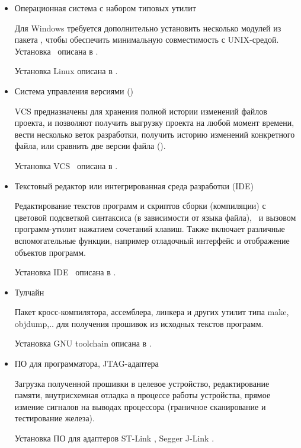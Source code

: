 
\begin{itemize}
  \item Операционная система с набором типовых утилит
  
  Для Windows требуется дополнительно установить несколько модулей из пакета
  , чтобы обеспечить минимальную совместимость с UNIX-средой.
  Установка \ описана в .
  
  Установка Linux описана в .
  
  \item Система управления версиями ()
  
  VCS предназначены для хранения полной истории изменений файлов проекта, и
  позволяют получить выгрузку проекта на любой момент времени, вести несколько
  веток разработки, получить историю изменений конкретного файла, или сравнить
  две версии файла ().
  
  Установка VCS \git\ описана в .
  
  \item Текстовый редактор или интегрированная среда разработки (IDE)
  
  Редактирование текстов программ и скриптов сборки (компиляции) с
  цветовой подсветкой синтаксиса (в зависимости от языка файла),
  \ и вызовом программ-утилит нажатием сочетаний 
  клавиш. Также включает различные вспомогательные функции, например
  отладочный интерфейс и отображение объектов программ.
  
  Установка IDE \eclipse\ описана в .
  
  \item Тулчайн
  
  Пакет кросс-компилятора, ассемблера, линкера и других утилит типа make,
  objdump,.. для получения прошивок из исходных текстов программ.
  
  Установка GNU toolchain описана в .
  
  \item ПО для программатора, JTAG-адаптера
  
  Загрузка полученной прошивки в целевое устройство, редактирование памяти, 
  внутрисхемная отладка в процессе работы устройства, прямое измение сигналов на
  выводах процессора (граничное сканирование и тестирование железа).
  
  Установка ПО для адаптеров ST-Link , Segger J-Link
  .
  

\end{itemize}
